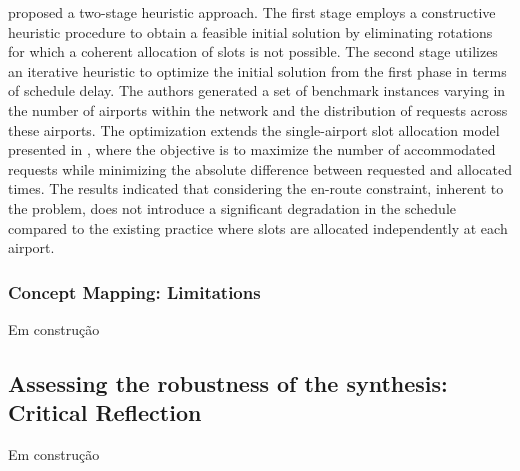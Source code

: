  proposed a two-stage heuristic approach. The first stage employs a constructive heuristic procedure to obtain a feasible initial solution by eliminating rotations for which a coherent allocation of slots is not possible. The second stage utilizes an iterative heuristic to optimize the initial solution from the first phase in terms of schedule delay. The authors generated a set of benchmark instances varying in the number of airports within the network and the distribution of requests across these airports. The optimization extends the single-airport slot allocation model presented in \cite{zografos2012dealing}, where the objective is to maximize the number of accommodated requests while minimizing the absolute difference between requested and allocated times. The results indicated that considering the en-route constraint, inherent to the problem, does not introduce a significant degradation in the schedule compared to the existing practice where slots are allocated independently at each airport.

\subsubsection{Concept Mapping: Limitations}

Em construção

%

\subsection{Assessing the robustness of the synthesis: Critical Reflection}


Em construção